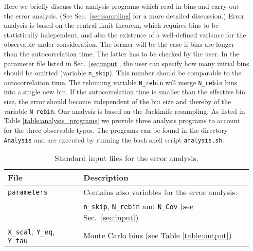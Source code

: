 %
Here we briefly   discuss the analysis programs which read in bins and carry out the error analysis. (See Sec.~\ref{sec:sampling}  for a more detailed discussion.)
Error analysis   is based  on the central limit theorem,  which requires bins to be statistically independent, and also the existence of a well-defined variance  for the observable under consideration. 
The former will be the case if bins are  longer than the autocorrelation time.  The latter has to be checked by the user.  In the parameter file listed in Sec.~\ref{sec:input}, the user  can specify how many initial bins should be omitted (variable \texttt{n\_skip}). 
This  number should be comparable to the autocorrelation time.     
The  rebinning  variable \texttt{N\_rebin} will merge \texttt{N\_rebin}  bins into a single new bin. 
If the autocorrelation time  is smaller than the effective bin size, the error should become independent of the bin size and thereby of the variable \texttt{N\_rebin}.  
Our analysis is based on the Jackknife resampling\cite{efron1981}.
As listed in Table  \ref{table:analysis_programs}  we provide three analysis programs to account for the three observable types. The programs can be found in the directory \texttt{Analysis}  and   are executed by running the  bash shell script 
\texttt{analysis.sh}.
%
\begin{table}[h]
	\begin{center}
	\begin{tabular}{@{} l l @{}}\toprule
		File & Description \\\midrule
		\texttt{parameters}  &  Contains also variables for the error analysis:\\
		& \texttt{n\_skip}, \texttt{N\_rebin} and \texttt{N\_Cov} (see Sec.~\ref{sec:input}) \\
		\texttt{X\_scal}, \texttt{Y\_eq}, \texttt{Y\_tau} & Monte Carlo bins (see Table \ref{table:output}) \\\bottomrule
	\end{tabular}
	\caption{Standard input files for the error analysis. \label{table:analysis_input}}
\end{center}
\end{table}
%
